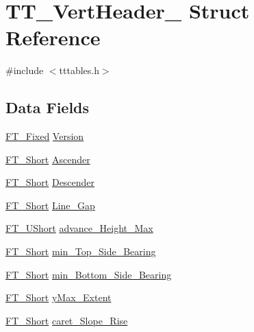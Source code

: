 \hypertarget{struct_t_t___vert_header__}{}\section{T\+T\+\_\+\+Vert\+Header\+\_\+ Struct Reference}
\label{struct_t_t___vert_header__}


{\ttfamily \#include $<$tttables.\+h$>$}

\subsection*{Data Fields}
\begin{DoxyCompactItemize}
\item 
\hyperlink{fttypes_8h_a5f5a679cc09f758efdd0d1c5feed3c3d}{F\+T\+\_\+\+Fixed} \hyperlink{struct_t_t___vert_header___a32d736621b757e9a39a15f2f82d15b9c}{Version}
\item 
\hyperlink{fttypes_8h_aa7279be89046a2563cd3d4d6651fbdcf}{F\+T\+\_\+\+Short} \hyperlink{struct_t_t___vert_header___afa95848b08d1fc8bd6bfe7e639e2895c}{Ascender}
\item 
\hyperlink{fttypes_8h_aa7279be89046a2563cd3d4d6651fbdcf}{F\+T\+\_\+\+Short} \hyperlink{struct_t_t___vert_header___afeeb8f6c759a76d655f24f1d58f1cf35}{Descender}
\item 
\hyperlink{fttypes_8h_aa7279be89046a2563cd3d4d6651fbdcf}{F\+T\+\_\+\+Short} \hyperlink{struct_t_t___vert_header___a8a6ad9f251e12e6701ebe53d19a65aa5}{Line\+\_\+\+Gap}
\item 
\hyperlink{fttypes_8h_a937f6c17cf5ffd09086d8610c37b9f58}{F\+T\+\_\+\+U\+Short} \hyperlink{struct_t_t___vert_header___a7a2acbd1abd4cc4d6f40110203f99d0f}{advance\+\_\+\+Height\+\_\+\+Max}
\item 
\hyperlink{fttypes_8h_aa7279be89046a2563cd3d4d6651fbdcf}{F\+T\+\_\+\+Short} \hyperlink{struct_t_t___vert_header___a10d78594a56f0966ae1d7b60138fbec2}{min\+\_\+\+Top\+\_\+\+Side\+\_\+\+Bearing}
\item 
\hyperlink{fttypes_8h_aa7279be89046a2563cd3d4d6651fbdcf}{F\+T\+\_\+\+Short} \hyperlink{struct_t_t___vert_header___a21422639a4cfd8dcdc9ebb3795676292}{min\+\_\+\+Bottom\+\_\+\+Side\+\_\+\+Bearing}
\item 
\hyperlink{fttypes_8h_aa7279be89046a2563cd3d4d6651fbdcf}{F\+T\+\_\+\+Short} \hyperlink{struct_t_t___vert_header___af6927e95c1dfbe90c2e76b1eef521d53}{y\+Max\+\_\+\+Extent}
\item 
\hyperlink{fttypes_8h_aa7279be89046a2563cd3d4d6651fbdcf}{F\+T\+\_\+\+Short} \hyperlink{struct_t_t___vert_header___a3218533a7d8ac5a8ebd70a970cbdbbcc}{caret\+\_\+\+Slope\+\_\+\+Rise}

\end{DoxyCompactItemize}
